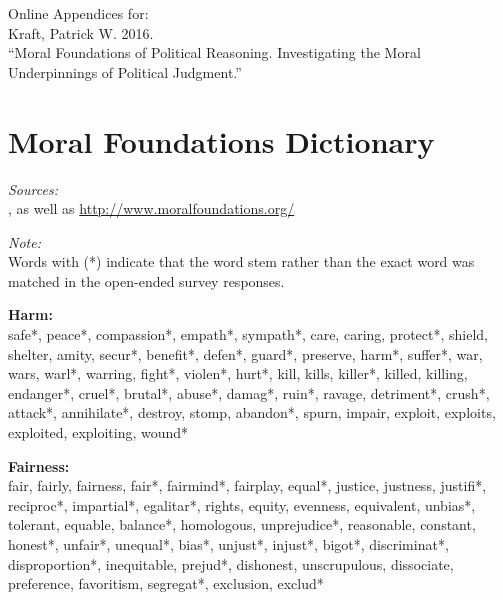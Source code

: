 \documentclass[12pt]{article}
\begin{document}
\clearpage\normalsize



\clearpage
\footnotesize\singlespacing
\appendices
\appendixpage
\renewcommand\thesubsection{\Roman{subsection}}
\begin{flushleft}
Online Appendices for: \\
Kraft, Patrick W. 2016.\\``Moral Foundations of Political Reasoning. Investigating the Moral Underpinnings of Political Judgment.''

\startcontents[sections]
\clearpage

\section{Moral Foundations Dictionary}\label{app:dict}
\renewcommand\thefigure{\thesection.\arabic{figure}}
\renewcommand\thetable{\thesection.\arabic{table}}
\setcounter{figure}{0}
\setcounter{table}{0}

\textit{Sources:}\\
\citet{graham2009liberals}, as well as \url{http://www.moralfoundations.org/}
\vspace{.5cm}

\textit{Note:}\\
Words with (*) indicate that the word stem rather than the exact word was matched in the open-ended survey responses.
\vspace{.5cm}

\textbf{Harm:}\\
safe*, peace*, compassion*, empath*, sympath*, care, caring, protect*, shield, shelter, amity, secur*, benefit*, defen*, guard*, preserve, harm*, suffer*, war, wars, warl*, warring, fight*, violen*, hurt*, kill, kills, killer*, killed, killing, endanger*, cruel*, brutal*, abuse*, damag*, ruin*, ravage, detriment*, crush*, attack*, annihilate*, destroy, stomp, abandon*, spurn, impair, exploit, exploits, exploited, exploiting, wound*
\vspace{.5cm}

\textbf{Fairness:}\\
fair, fairly, fairness, fair*, fairmind*, fairplay, equal*, justice, justness, justifi*, reciproc*, impartial*, egalitar*, rights, equity, evenness, equivalent, unbias*, tolerant, equable, balance*, homologous, unprejudice*, reasonable, constant, honest*, unfair*, unequal*, bias*, unjust*, injust*, bigot*, discriminat*, disproportion*, inequitable, prejud*, dishonest, unscrupulous, dissociate, preference, favoritism, segregat*, exclusion, exclud*
\vspace{.5cm}


\end{flushleft}
\end{document}
